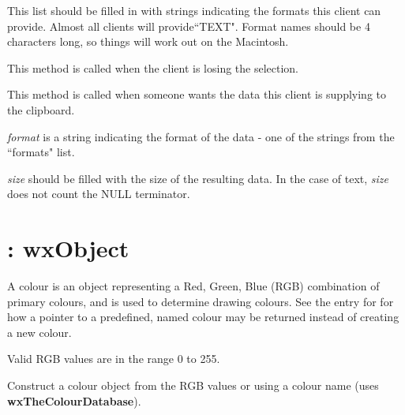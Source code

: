 

This list should be filled in with strings indicating the formats
this client can provide. Almost all clients will provide``TEXT".
Format names should be 4 characters long, so things will work
out on the Macintosh.



This method is called when the client is losing the selection.



This method is called when someone wants the data this client is
supplying to the clipboard.

{\it format} is a string indicating the
format of the data - one of the strings from the ``formats"
list.

{\it size} should be filled with the size of the resulting
data. In the case of text, {\it size} does not count the
NULL terminator.

\section{: wxObject}\label{wxcolour}

A colour is an object representing a Red, Green, Blue (RGB) combination
of primary colours, and is used to determine drawing colours. See the
entry for  for how a pointer to a predefined,
named colour may be returned instead of creating a new colour.

Valid RGB values are in the range 0 to 255.




Construct a colour object from the RGB values or using a colour name
(uses {\bf wxTheColourDatabase}).

\label{wxcolourequal}


